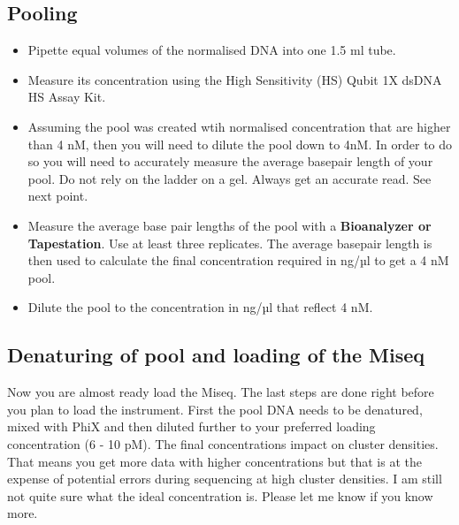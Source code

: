 \documentclass[
]{book}
\begin{document}
\hypertarget{pooling}{%
\subsection{Pooling}\label{pooling}}

\begin{itemize}
\item
  Pipette equal volumes of the normalised DNA into one 1.5 ml tube.\\
\item
  Measure its concentration using the High Sensitivity (HS) Qubit 1X dsDNA HS Assay Kit.\\
\item
  Assuming the pool was created wtih normalised concentration that are higher than 4 nM, then you will need to dilute the pool down to 4nM. In order to do so you will need to accurately measure the average basepair length of your pool. Do not rely on the ladder on a gel. Always get an accurate read. See next point.\\
\item
  Measure the average base pair lengths of the pool with a \textbf{Bioanalyzer or Tapestation}. Use at least three replicates. The average basepair length is then used to calculate the final concentration required in ng/µl to get a 4 nM pool.\\
\item
  Dilute the pool to the concentration in ng/µl that reflect 4 nM.

  \hfill\break
\end{itemize}

\hypertarget{denaturing-of-pool-and-loading-of-the-miseq}{%
\subsection{Denaturing of pool and loading of the Miseq}\label{denaturing-of-pool-and-loading-of-the-miseq}}

Now you are almost ready load the Miseq. The last steps are done right before you plan to load the instrument. First the pool DNA needs to be denatured, mixed with PhiX and then diluted further to your preferred loading concentration (6 - 10 pM). The final concentrations impact on cluster densities. That means you get more data with higher concentrations but that is at the expense of potential errors during sequencing at high cluster densities. I am still not quite sure what the ideal concentration is. Please let me know if you know more.
\end{document}

